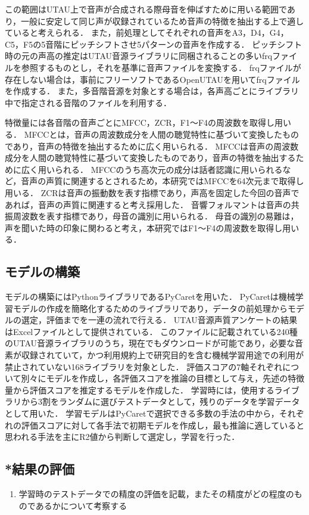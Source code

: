 \documentclass[a4j,8pt,twocolumn]{extarticle}
\begin{document}
この範囲はUTAU上で音声が合成される際母音を伸ばすために用いる範囲であり，一般に安定して同じ声が収録されているため音声の特徴を抽出する上で適していると考えられる．
また，前処理としてそれぞれの音声をA3，D4，G4，C5，F5の5音階にピッチシフトさせ5パターンの音声を作成する．
ピッチシフト時の元の声高の推定はUTAU音源ライブラリに同梱されることの多いfrqファイルを参照するものとし，それを基準に音声ファイルを変換する．
frqファイルが存在しない場合は，事前にフリーソフトであるOpenUTAUを用いてfrqファイルを作成する．
また，多音階音源を対象とする場合は，各声高ごとにライブラリ中で指定される音階のファイルを利用する．

特徴量には各音階の音声ごとにMFCC，ZCR，F1〜F4の周波数を取得し用いる．
MFCCとは，音声の周波数成分を人間の聴覚特性に基づいて変換したものであり，音声の特徴を抽出するために広く用いられる．
MFCCは音声の周波数成分を人間の聴覚特性に基づいて変換したものであり，音声の特徴を抽出するために広く用いられる．
MFCCのうち高次元の成分は話者認識に用いられるなど，音声の声質に関連するとされる\cite{}ため，本研究ではMFCCを64次元まで取得し用いる．
ZCRは音声の振動数を表す指標であり，声高を固定した今回の音声であれば，音声の声質に関連すると考え採用した．
音響フォルマントは音声の共振周波数を表す指標であり，母音の識別に用いられる．
母音の識別の易難は，声を聞いた時の印象に関わると考え，本研究ではF1〜F4の周波数を取得し用いる．

\subsection{モデルの構築}
モデルの構築にはPythonライブラリであるPyCaretを用いた．
PyCaretは機械学習モデルの作成を簡略化するためのライブラリであり，データの前処理からモデルの選定，評価までを一連の流れで行える．
UTAU音源声質アンケートの結果はExcelファイルとして提供されている．
このファイルに記載されている240種のUTAU音源ライブラリのうち，現在でもダウンロードが可能であり，必要な音素が収録されていて，かつ利用規約上で研究目的を含む機械学習用途での利用が禁止されていない168ライブラリを対象とした．
評価スコアの7軸それぞれについて別々にモデルを作成し，各評価スコアを推論の目標として与え，先述の特徴量から評価スコアを推定するモデルを作成した．
学習時には，使用するライブラリから3割をランダムに選びテストデータとして，残りのデータを学習データとして用いた．
学習モデルはPyCaretで選択できる多数の手法の中から，それぞれの評価スコアに対して各手法で初期モデルを作成し，最も推論に適していると思われる手法を主にR2値から判断して選定し，学習を行った．

\subsection{*結果の評価}
\begin{enumerate}
  \item 学習時のテストデータでの精度の評価を記載，またその精度がどの程度のものであるかについて考察する
\end{enumerate}
\end{document}
